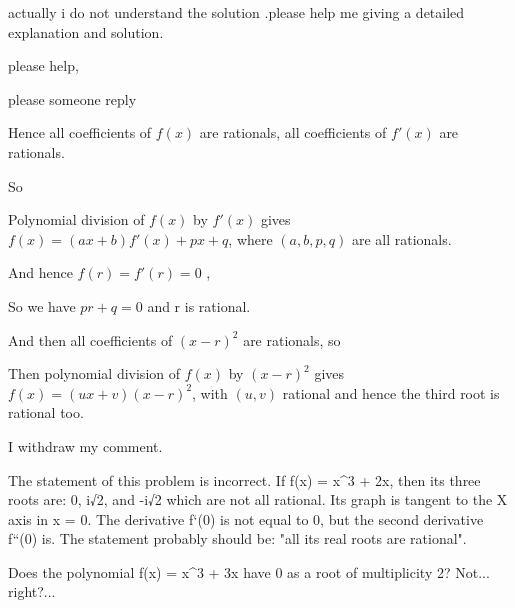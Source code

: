 \begin{solution}
	actually i do not understand the solution .please help me giving a detailed explanation and solution.

please help,
\end{solution}



\begin{solution}
	please someone reply
\end{solution}



\begin{solution}
	Hence all coefficients of $ f(x)$ are rationals, all coefficients of $ f'(x)$ are rationals.

So 

\begin{tcolorbox}
Polynomial division of $ f(x)$ by $ f'(x)$ gives $ f(x) = (ax + b)f'(x) + px + q$, where $ (a,b,p,q)$ are all rationals.
\end{tcolorbox}

And hence $ f(r)=f'(r)=0$ ,

\begin{tcolorbox}
So we have $ pr + q = 0$ and r is rational.
\end{tcolorbox}

And then all coefficients of $ (x-r)^{2}$  are rationals, so

\begin{tcolorbox}
Then polynomial division of $ f(x)$ by $ (x - r)^{2}$ gives $ f(x) = (ux + v)(x - r)^{2}$, with $ (u,v)$ rational and hence the third root is rational too.
\end{tcolorbox}
\end{solution}



\begin{solution}
	I withdraw my comment.
\end{solution}



\begin{solution}
	\begin{tcolorbox}The statement of this problem is incorrect. If f(x) = x^3 + 2x, then its three roots are: 0, i√2, and -i√2 which are not all rational. Its graph is tangent to the X axis in x = 0. The derivative f`(0) is not equal to 0, but the second derivative f``(0) is. The statement probably should be: "all its real roots are rational".\end{tcolorbox}

Does the polynomial f(x) = x^3 + 3x have 0 as a root of multiplicity 2? Not... right?...
\end{solution}



